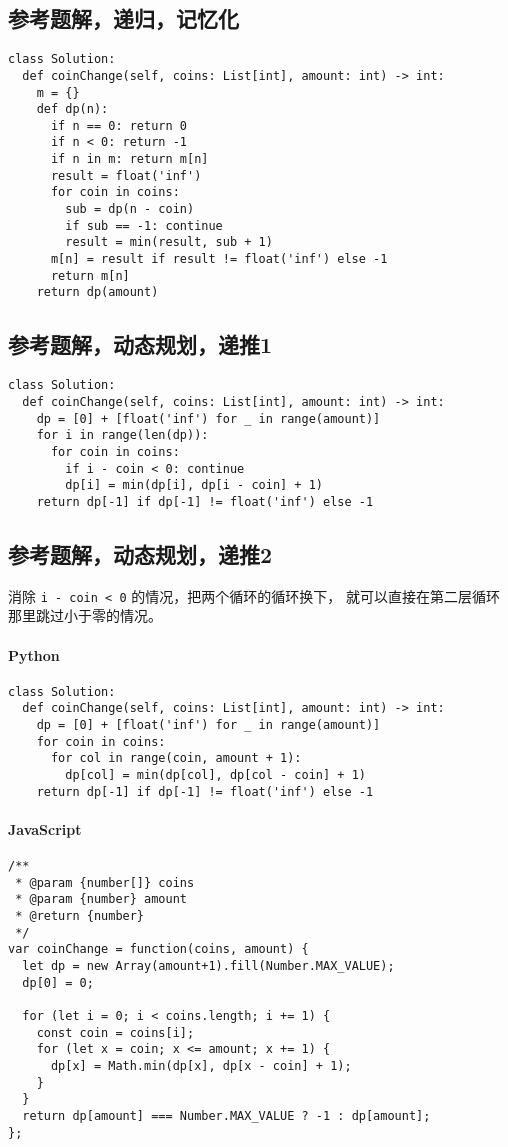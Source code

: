 \subsection{参考题解，递归，记忆化}

\begin{verbatim}
class Solution:
  def coinChange(self, coins: List[int], amount: int) -> int:
    m = {}
    def dp(n):
      if n == 0: return 0
      if n < 0: return -1
      if n in m: return m[n]
      result = float('inf')
      for coin in coins:
        sub = dp(n - coin)
        if sub == -1: continue
        result = min(result, sub + 1)
      m[n] = result if result != float('inf') else -1
      return m[n]
    return dp(amount)
\end{verbatim}

\subsection{参考题解，动态规划，递推1}

\begin{verbatim}
class Solution:
  def coinChange(self, coins: List[int], amount: int) -> int:
    dp = [0] + [float('inf') for _ in range(amount)]
    for i in range(len(dp)):
      for coin in coins:
        if i - coin < 0: continue
        dp[i] = min(dp[i], dp[i - coin] + 1)
    return dp[-1] if dp[-1] != float('inf') else -1
\end{verbatim}

\subsection{参考题解，动态规划，递推2}

消除 \verb|i - coin < 0| 的情况，把两个循环的循环换下，
就可以直接在第二层循环那里跳过小于零的情况。

\paragraph{Python}

\begin{verbatim}
class Solution:
  def coinChange(self, coins: List[int], amount: int) -> int:
    dp = [0] + [float('inf') for _ in range(amount)]
    for coin in coins:
      for col in range(coin, amount + 1):
        dp[col] = min(dp[col], dp[col - coin] + 1)
    return dp[-1] if dp[-1] != float('inf') else -1
\end{verbatim}

\paragraph{JavaScript}

\begin{verbatim}
/**
 * @param {number[]} coins
 * @param {number} amount
 * @return {number}
 */
var coinChange = function(coins, amount) {
  let dp = new Array(amount+1).fill(Number.MAX_VALUE);
  dp[0] = 0;

  for (let i = 0; i < coins.length; i += 1) {
    const coin = coins[i];
    for (let x = coin; x <= amount; x += 1) {
      dp[x] = Math.min(dp[x], dp[x - coin] + 1);
    }
  }
  return dp[amount] === Number.MAX_VALUE ? -1 : dp[amount];
};
\end{verbatim}

